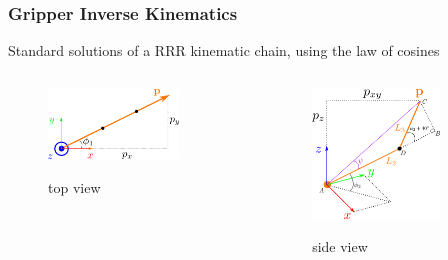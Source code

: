 \begin{frame}
\frametitle{Gripper Inverse Kinematics}
Standard solutions of a RRR kinematic chain, using the law of cosines
\begin{columns}
\begin{center}
\begin{figure}[!htb]
\centering
\includegraphics[width=0.8\textwidth]{../images/grasper-rrr-top.png}\\
\caption{top view}
\end{figure}
\end{center}
\begin{center}
\begin{figure}[!htb]
\centering
\includegraphics[width=0.8\textwidth]{../images/grasper-rrr-side.png}\\
\caption{side view}
\end{figure}
\end{center}
\end{columns}
\end{frame}
